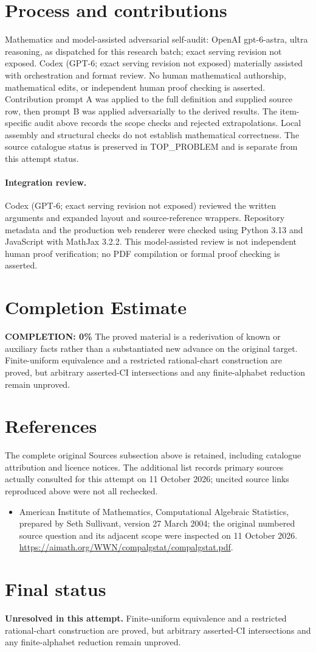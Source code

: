 \documentclass[11pt]{article}
\begin{document}
\section{Process and contributions}
Mathematics and model-assisted adversarial self-audit: OpenAI gpt-6-astra, ultra reasoning, as dispatched for this research batch; exact serving revision not exposed. Codex (GPT-6; exact serving revision not exposed) materially assisted with orchestration and format review. No human mathematical authorship, mathematical edits, or independent human proof checking is asserted.
Contribution prompt A was applied to the full definition and supplied source row, then prompt B was applied adversarially to the derived results. The item-specific audit above records the scope checks and rejected extrapolations. Local assembly and structural checks do not establish mathematical correctness. The source catalogue status is preserved in TOP\_PROBLEM and is separate from this attempt status.
\paragraph{Integration review.} Codex (GPT-6; exact serving revision not exposed) reviewed the written arguments and expanded layout and source-reference wrappers. Repository metadata and the production web renderer were checked using Python 3.13 and JavaScript with MathJax 3.2.2. This model-assisted review is not independent human proof verification; no PDF compilation or formal proof checking is asserted.

\section{Completion Estimate}
\noindent\textbf{COMPLETION: 0\%}
The proved material is a rederivation of known or auxiliary facts rather than a substantiated new advance on the original target. Finite-uniform equivalence and a restricted rational-chart construction are proved, but arbitrary asserted-CI intersections and any finite-alphabet reduction remain unproved.
\section{References}
The complete original Sources subsection above is retained, including catalogue attribution and licence notices. The additional list records primary sources actually consulted for this attempt on 11 October 2026; uncited source links reproduced above were not all rechecked.
\begin{itemize}
\item American Institute of Mathematics, Computational Algebraic Statistics, prepared by Seth Sullivant, version 27 March 2004; the original numbered source question and its adjacent scope were inspected on 11 October 2026. \url{https://aimath.org/WWN/compalgstat/compalgstat.pdf}.
\end{itemize}
\section{Final status}
\textbf{Unresolved in this attempt.} Finite-uniform equivalence and a restricted rational-chart construction are proved, but arbitrary asserted-CI intersections and any finite-alphabet reduction remain unproved.
\end{document}
